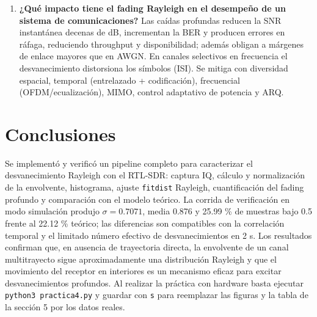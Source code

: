 \documentclass[11pt,a4paper]{article}
\begin{document}
\begin{enumerate}
  \item \textbf{¿Qué impacto tiene el fading Rayleigh en el desempeño de un sistema de comunicaciones?} Las caídas profundas reducen la SNR instantánea decenas de dB, incrementan la BER y producen errores en ráfaga, reduciendo throughput y disponibilidad; además obligan a márgenes de enlace mayores que en AWGN. En canales selectivos en frecuencia el desvanecimiento distorsiona los símbolos (ISI). Se mitiga con diversidad espacial, temporal (entrelazado + codificación), frecuencial (OFDM/ecualización), MIMO, control adaptativo de potencia y ARQ.
\end{enumerate}

\section{Conclusiones}

Se implementó y verificó un pipeline completo para caracterizar el desvanecimiento Rayleigh con el RTL-SDR: captura IQ, cálculo y normalización de la envolvente, histograma, ajuste \texttt{fitdist} Rayleigh, cuantificación del fading profundo y comparación con el modelo teórico. La corrida de verificación en modo simulación produjo $\sigma = 0.7071$, media 0.876 y 25.99 \% de muestras bajo 0.5 frente al 22.12 \% teórico; las diferencias son compatibles con la correlación temporal y el limitado número efectivo de desvanecimientos en 2 s. Los resultados confirman que, en ausencia de trayectoria directa, la envolvente de un canal multitrayecto sigue aproximadamente una distribución Rayleigh y que el movimiento del receptor en interiores es un mecanismo eficaz para excitar desvanecimientos profundos. Al realizar la práctica con hardware basta ejecutar \texttt{python3 practica4.py} y guardar con \texttt{s} para reemplazar las figuras y la tabla de la sección 5 por los datos reales.
\end{document}
